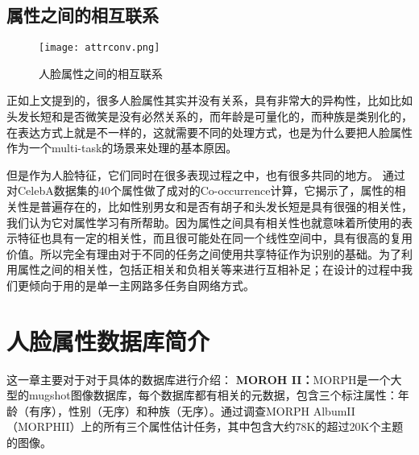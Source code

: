 \subsection{属性之间的相互联系}
\begin{figure}[!ht]
 \centering
	\texttt{[image: attrconv.png]}
	\caption{人脸属性之间的相互联系}
\end{figure}


正如上文提到的，很多人脸属性其实并没有关系，具有非常大的异构性，比如比如头发长短和是否微笑是没有必然关系的，而年龄是可量化的，而种族是类别化的，在表达方式上就是不一样的，这就需要不同的处理方式，也是为什么要把人脸属性作为一个multi-task的场景来处理的基本原因。

但是作为人脸特征，它们同时在很多表现过程之中，也有很多共同的地方。
通过对CelebA数据集的40个属性做了成对的Co-occurrence计算，它揭示了，属性的相关性是普遍存在的，比如性别男女和是否有胡子和头发长短是具有很强的相关性，我们认为它对属性学习有所帮助。因为属性之间具有相关性也就意味着所使用的表示特征也具有一定的相关性，而且很可能处在同一个线性空间中，具有很高的复用价值。所以完全有理由对于不同的任务之间使用共享特征作为识别的基础。为了利用属性之间的相关性，包括正相关和负相关等来进行互相补足；在设计的过程中我们更倾向于用的是单一主网路多任务自网络方式。

\section{人脸属性数据库简介}
这一章主要对于对于具体的数据库进行介绍：
\textbf{MOROH II：}MORPH是一个大型的mugshot图像数据库，每个数据库都有相关的元数据，包含三个标注属性：年龄（有序），性别（无序）和种族（无序）。通过调查MORPH AlbumII（MORPHII）上的所有三个属性估计任务，其中包含大约78K的超过20K个主题的图像。

